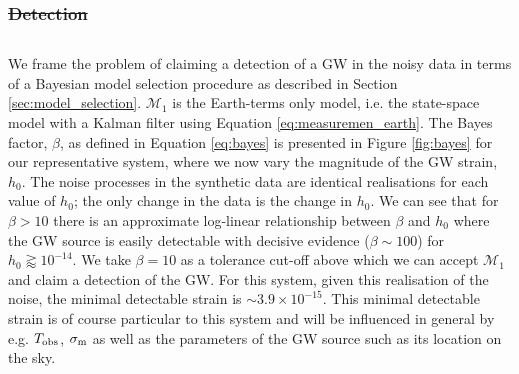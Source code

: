 \documentclass[fleqn,usenatbib,useAMS]{mnras}
\providecommand{\DIFadd}[1]{{\protect\color{blue}\uwave{#1}}} %
\providecommand{\DIFdel}[1]{{\protect\color{red}\sout{#1}}}                      %
\providecommand{\DIFaddbegin}{} %
\providecommand{\DIFaddend}{} %
\providecommand{\DIFdelbegin}{} %
\providecommand{\DIFdelend}{} %
\newcommand{\DIFscaledelfig}{0.5}
\newlength{\DIFdelgraphicswidth} %
\newlength{\DIFdelgraphicsheight} %
\newcommand{\DIFaddincludegraphics}[2][]{{\color{blue}\fbox{\DIFOincludegraphics[#1]{#2}}}} %
\newcommand{\DIFdelincludegraphics}[2][]{%
\sbox{\DIFdelgraphicsbox}{\DIFOincludegraphics[#1]{#2}}%
\settoboxwidth{\DIFdelgraphicswidth}{\DIFdelgraphicsbox} %
\settoboxtotalheight{\DIFdelgraphicsheight}{\DIFdelgraphicsbox} %
\scalebox{\DIFscaledelfig}{%
\parbox[b]{\DIFdelgraphicswidth}{\usebox{\DIFdelgraphicsbox}\\[-\baselineskip] \rule{\DIFdelgraphicswidth}{0em}}\llap{\resizebox{\DIFdelgraphicswidth}{\DIFdelgraphicsheight}{%
\setlength{\unitlength}{\DIFdelgraphicswidth}%
\begin{picture}(1,1)%
\thicklines\linethickness{2pt} %
{\color[rgb]{1,0,0}\put(0,0){\framebox(1,1){}}}%
{\color[rgb]{1,0,0}\put(0,0){\line( 1,1){1}}}%
{\color[rgb]{1,0,0}\put(0,1){\line(1,-1){1}}}%
\end{picture}%
}\hspace*{3pt}}} %
} %
\DeclareRobustCommand{\DIFaddbegin}{\DIFOaddbegin \let\includegraphics\DIFaddincludegraphics} %
\DeclareRobustCommand{\DIFaddend}{\DIFOaddend \let\includegraphics\DIFOincludegraphics} %
\DeclareRobustCommand{\DIFdelbegin}{\DIFOdelbegin \let\includegraphics\DIFdelincludegraphics} %
\DeclareRobustCommand{\DIFdelend}{\DIFOaddend \let\includegraphics\DIFOincludegraphics} %
\begin{document}
\DIFdelbegin \subsubsection{\DIFdel{Detection}} %
\addtocounter{subsubsection}{-1}%
\DIFdelend \DIFaddbegin \subsection{\DIFadd{Detection}} \DIFaddend \label{sec:detection}
We frame the problem of claiming a detection of a GW in the noisy data in terms of a Bayesian model selection procedure as described in Section \ref{sec:model_selection}. $\mathcal{M}_1$ is the Earth-terms only model, i.e. the state-space model with a Kalman filter using Equation \eqref{eq:measuremen_earth}. The Bayes factor, $\beta$, as defined in Equation \eqref{eq:bayes} is presented in Figure \ref{fig:bayes} for our representative system, where we now vary the magnitude of the GW strain, $h_0$. The noise processes in the synthetic data are identical realisations for each value of $h_0$; the only change in the data is the change in $h_0$. We can see that for $\beta >10$ there is an approximate log-linear relationship between $\beta$ and $h_0$ where the GW source is easily detectable with decisive evidence ($\beta \sim 100$) for $h_0 \gtrapprox 10^{-14}$. We take $\beta = 10$ as a tolerance cut-off above which we can accept $\mathcal{M}_1$ and claim a detection of the GW. For this system, given this realisation of the noise, the minimal detectable strain is $\sim 3.9 \times 10^{-15}$. This minimal detectable strain is of course particular to this system and will be influenced in general by e.g. $T_{\rm obs}$, $\sigma_{\rm m}$ as well as the parameters of the GW source such as its location on the sky. \newline 
\end{document}
